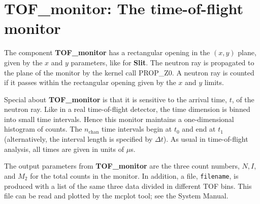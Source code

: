 \section{TOF\_monitor: The time-of-flight monitor}

The component \textbf{TOF\_monitor} has a rectangular opening
in the $(x,y)$ plane, given by the $x$ and $y$ parameters,
like for \textbf{Slit}.
The neutron ray is propagated to the plane of the monitor
by the kernel call PROP\_Z0.
A neutron ray is counted if it passes within the rectangular opening
given by the $x$ and $y$ limits.

Special about \textbf{TOF\_monitor} is that it is sensitive to
the arrival time, $t$, of the neutron ray.
Like in a real time-of-flight detector, the time dimension is
binned into small time intervals.
Hence this monitor maintains a one-dimensional histogram of counts.
The $n_\textrm{chan}$ time intervals begin at $t_0$ and
end at $t_1$ (alternatively, the interval length is specified by $\Delta t$).
As usual in time-of-flight analysis, all times are given in units of $\mu$s.

The output parameters from \textbf{TOF\_monitor} are the three count numbers,
$N, I$, and $M_2$ for the total counts in the monitor.
In addition, a file, \verb+filename+, is produced with a list of
the same three data divided in different TOF bins.
This file can be read and plotted by the \textrm{mcplot} tool; see the
System Manual.

